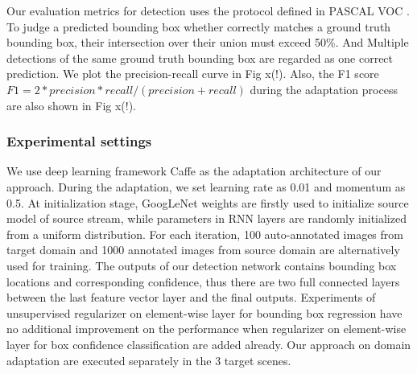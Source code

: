 \documentclass[runningheads]{llncs}
\begin{document}
Our evaluation metrics for detection uses the protocol defined in PASCAL VOC \cite{everingham2015pascal}. To judge a predicted bounding box whether correctly matches a ground truth bounding box, their intersection over their union must exceed 50\%. And Multiple detections of the same ground truth bounding box are regarded as one correct prediction. We plot the precision-recall curve in Fig x(!). Also, the F1 score $F1 = 2*precision*recall/(precision+recall)$ during the adaptation process are also shown in Fig x(!).



\subsubsection{Experimental settings}
We use deep learning framework Caffe \cite{jia2014caffe} as the adaptation architecture of our approach. During the adaptation, we set learning rate as 0.01 and momentum as 0.5. At initialization stage, GoogLeNet weights are firstly used to initialize source model of source stream, while parameters in RNN layers are randomly initialized from a uniform distribution. For each iteration, 100 auto-annotated images from target domain and 1000 annotated images from source domain are alternatively used for training. The outputs of our detection network contains bounding box locations and corresponding confidence, thus there are two full connected layers between the last feature vector layer and the final outputs. Experiments of unsupervised regularizer on element-wise layer for bounding box regression have no additional improvement on the performance when regularizer on element-wise layer for box confidence classification are added already. Our approach on domain adaptation are executed separately in the 3 target scenes.
\end{document}

